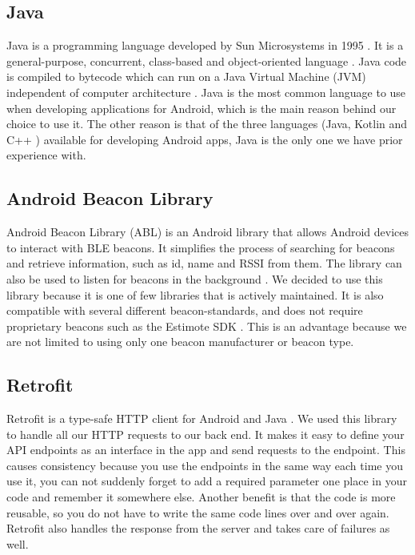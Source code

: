 \documentclass[../Main/thesis.tex]{subfiles}
\begin{document}
\subsection{Java}
Java is a programming language developed by Sun Microsystems in 1995 \citep{SunMicrosystems1996}. 
It is a general-purpose, concurrent, class-based and object-oriented language \citep[p. 1]{Gosling2018}.
Java code is compiled to bytecode which can run on a Java Virtual Machine (JVM) independent of computer architecture \citep{Venners2000}. 
Java is the most common language to use when developing applications for Android, which is the main reason behind our choice to use it.
The other reason is that of the three languages (Java, Kotlin and C++ \citep{Google2018b}) available for developing Android apps, Java is the only one we have prior experience with.


\subsection{Android Beacon Library}
Android Beacon Library (ABL) is an Android library that allows Android devices to interact with BLE beacons. 
It simplifies the process of searching for beacons and retrieve information, such as id, name and RSSI from them.
The library can also be used to listen for beacons in the background \citep{RadiusNetwork2015}.
We decided to use this library because it is one of few libraries that is actively maintained.
It is also compatible with several different beacon-standards, and does not require proprietary beacons such as the Estimote SDK \citep{Estimote2017}.
This is an advantage because we are not limited to using only one beacon manufacturer or beacon type.

\subsection{Retrofit}
Retrofit is a type-safe HTTP client for Android and Java \citep{SquareInc.2017}.
We used this library to handle all our HTTP requests to our back end. 
It makes it easy to define your API endpoints as an interface in the app and send requests to the endpoint.
This causes consistency because you use the endpoints in the same way each time you use it, you can not suddenly forget to add a required parameter one place in your code and remember it somewhere else.
Another benefit is that the code is more reusable, so you do not have to write the same code lines over and over again.
Retrofit also handles the response from the server and takes care of failures as well.
\end{document}
